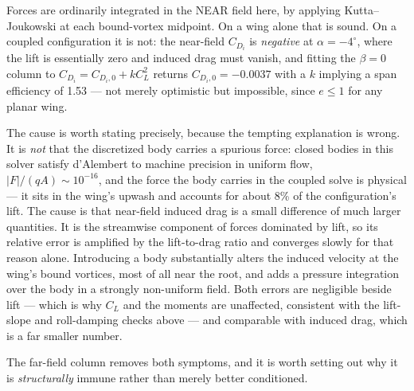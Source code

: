 \documentclass[submit]{aiaa-tc}%
\begin{document}
Forces are ordinarily integrated in the NEAR field here, by applying
Kutta--Joukowski at each bound-vortex midpoint. On a wing alone that is
sound. On a coupled configuration it is not: the near-field $C_{D_i}$ is
\emph{negative} at $\alpha = -4^\circ$, where the lift is essentially zero
and induced drag must vanish, and fitting the $\beta = 0$ column to
$C_{D_i} = C_{D_i,0} + kC_L^2$ returns $C_{D_i,0} = -0.0037$ with a $k$
implying a span efficiency of 1.53 --- not merely optimistic but
impossible, since $e \leq 1$ for any planar wing.

The cause is worth stating precisely, because the tempting explanation is
wrong. It is \emph{not} that the discretized body carries a spurious
force: closed bodies in this solver satisfy d'Alembert to machine
precision in uniform flow, $|F|/(q A) \sim 10^{-16}$, and the force the
body carries in the coupled solve is physical --- it sits in the wing's
upwash and accounts for about 8\% of the configuration's lift. The cause
is that near-field induced drag is a small difference of much larger
quantities. It is the streamwise component of forces dominated by lift, so
its relative error is amplified by the lift-to-drag ratio and converges
slowly for that reason alone. Introducing a body substantially alters the
induced velocity at the wing's bound vortices, most of all near the root,
and adds a pressure integration over the body in a strongly non-uniform
field. Both errors are negligible beside lift --- which is why $C_L$ and
the moments are unaffected, consistent with the lift-slope and
roll-damping checks above --- and comparable with induced drag, which is a
far smaller number.

The far-field column removes both symptoms, and it is worth setting out
why it is \emph{structurally} immune rather than merely better conditioned.
\end{document}
